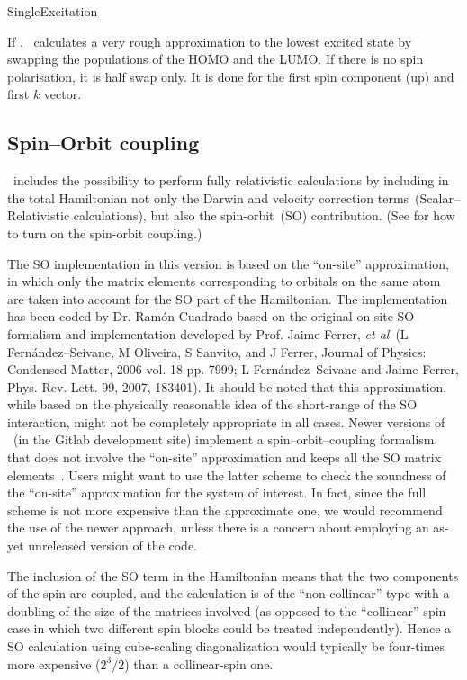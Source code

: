 \begin{fdflogicalF}{SingleExcitation}

  If \fdftrue, \siesta\ calculates a very rough approximation to the
  lowest excited state by swapping the populations of the HOMO and the
  LUMO. If there is no spin polarisation, it is half swap only.  It is
  done for the first spin component (up) and first $k$ vector.
  
\end{fdflogicalF}


\subsection{Spin--Orbit coupling}
\label{sec:spin-orbit}

\siesta\ includes the possibility to perform fully relativistic
calculations by including in the total Hamiltonian not
only the Darwin and velocity correction terms~(Scalar--Relativistic
calculations), but also the spin-orbit~(SO) contribution.
(See  for how to turn on the spin-orbit coupling.)

The SO implementation in this version is based on the ``on-site''
approximation, in which only the matrix elements corresponding to
orbitals on the same atom are taken into account for the SO part of
the Hamiltonian. The implementation has been coded by Dr. Ram\'on
Cuadrado based on the original on-site SO formalism and implementation
developed by Prof. Jaime Ferrer, \textit{et al}~(L
Fern\'andez--Seivane, M Oliveira, S Sanvito, and J Ferrer, Journal of
Physics: Condensed Matter, 2006 vol. 18 pp. 7999; L
Fern\'andez--Seivane and Jaime Ferrer, Phys. Rev. Lett. 99, 2007,
183401). It should be noted that this approximation, while based on
the physically reasonable idea of the short-range of the SO
interaction, might not be completely appropriate in all cases. Newer
versions of \siesta\ (in the Gitlab development site) implement a
spin--orbit--coupling formalism that does not involve the ``on-site''
approximation and keeps all the SO matrix
elements~\cite{doi:10.1063/5.0005077}. Users might want to use the
latter scheme to check the soundness of the ``on-site'' approximation
for the system of interest. In fact, since the full scheme is not more
expensive than the approximate one, we would recommend the use of the
newer approach, unless there is a concern about employing an as-yet
unreleased version of the code.

The inclusion of the SO term in the Hamiltonian means that the
two components of the spin are coupled, and the calculation is of the
``non-collinear'' type with a doubling of the size of the matrices involved
(as opposed to the ``collinear'' spin case in which two different spin
blocks could be treated independently). Hence a SO calculation using
cube-scaling diagonalization would typically be four-times more
expensive ($2^3/2$) than a collinear-spin one.

